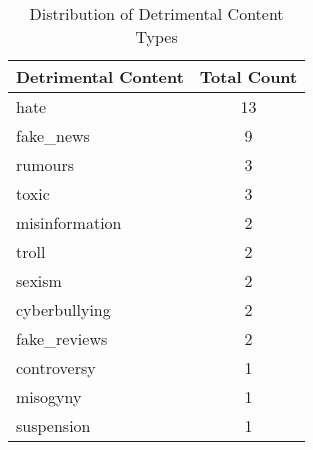 \documentclass{article}
\begin{document}
\begin{table}[h!]
\centering
\small %
\caption{Distribution of Detrimental Content Types}
\begin{tabular}{@{} l c @{}} 
\toprule
\textbf{Detrimental Content} & \textbf{Total Count} \\
\midrule
hate & 13 \\
fake\_news & 9 \\
rumours & 3 \\
toxic & 3 \\
misinformation & 2 \\
troll & 2 \\
sexism & 2 \\
cyberbullying & 2 \\
fake\_reviews & 2 \\
controversy & 1 \\
misogyny & 1 \\
suspension & 1 \\
\bottomrule
\end{tabular}
\end{table}
\end{document}
